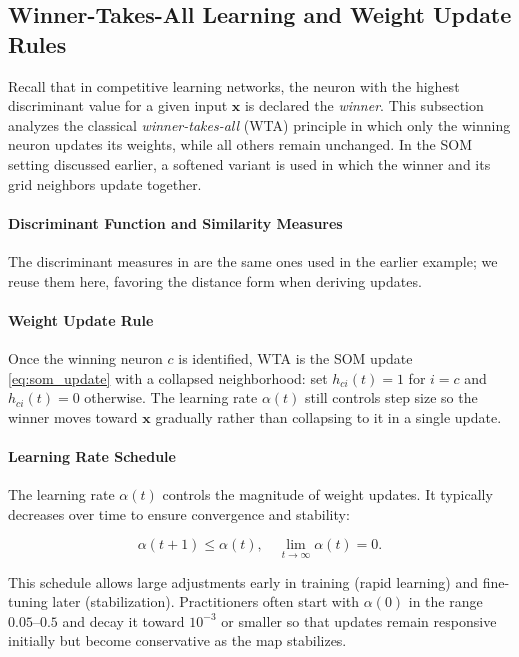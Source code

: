 \subsection{Winner-Takes-All Learning and Weight Update Rules}
\label{sec:som_winner_takes_all_learning_and_weight_update_rules}

Recall that in competitive learning networks, the neuron with the highest discriminant value for a given input \(\mathbf{x}\) is declared the \emph{winner}. This subsection analyzes the classical \emph{winner-takes-all} (WTA) principle in which only the winning neuron updates its weights, while all others remain unchanged. In the SOM setting discussed earlier, a softened variant is used in which the winner and its grid neighbors update together.

\paragraph{Discriminant Function and Similarity Measures}

The discriminant measures in  are the same ones used in the earlier example; we reuse them here, favoring the distance form when deriving updates.

\paragraph{Weight Update Rule}

Once the winning neuron \(c\) is identified, WTA is the SOM update \eqref{eq:som_update} with a collapsed neighborhood: set \(h_{ci}(t)=1\) for \(i=c\) and \(h_{ci}(t)=0\) otherwise. The learning rate \(\alpha(t)\) still controls step size so the winner moves toward \(\mathbf{x}\) gradually rather than collapsing to it in a single update.

\paragraph{Learning Rate Schedule}

The learning rate \(\alpha(t)\) controls the magnitude of weight updates. It typically decreases over time to ensure convergence and stability:

\[
\alpha(t+1) \leq \alpha(t), \quad \lim_{t \to \infty} \alpha(t) = 0.
\]

This schedule allows large adjustments early in training (rapid learning) and fine-tuning later (stabilization).
Practitioners often start with \(\alpha(0)\) in the range \(0.05\)--\(0.5\) and decay it toward \(10^{-3}\) or smaller so that updates remain responsive initially but become conservative as the map stabilizes.

